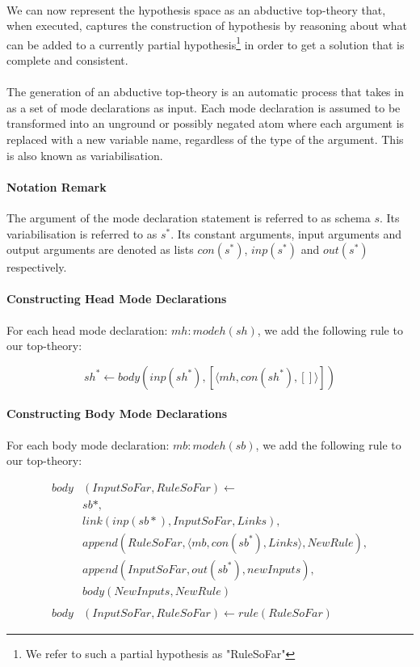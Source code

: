 \documentclass{article}
\theoremstyle{plain}
\theoremstyle{definition}
\begin{document}
\begin{multicols}{2}
\paragraph{} We can now represent the hypothesis space as an abductive top-theory that, when executed, captures the construction of hypothesis by reasoning about what can be added to a currently partial hypothesis\footnote{We refer to such a partial hypothesis as "RuleSoFar"} in order to get a solution that is complete and consistent.

\paragraph{} The generation of an abductive top-theory is an automatic process that takes in as a set of mode declarations as input. Each mode declaration is assumed to be transformed into an unground or possibly negated atom where each argument is replaced with a new variable name, regardless of the type of the argument. This is also known as variabilisation.

\paragraph{Notation Remark} The argument of the mode declaration statement is referred to as schema $s$. Its variabilisation is referred to as $s^*$. Its constant arguments, input arguments and output arguments are denoted as lists $con(s^*)$, $inp(s^*)$ and $out(s^*)$ respectively.

\paragraph{Constructing Head Mode Declarations} For each head mode declaration: $mh: modeh(sh)$, we add the following rule to our top-theory:

$$sh^* \leftarrow body(inp(sh^*), [\langle mh, con(sh^*), [] \rangle])$$


\paragraph{Constructing Body Mode Declarations} For each body mode declaration: $mb: modeh(sb)$, we add the following rule to our top-theory:

{\footnotesize
\begin{align*}
body&(InputSoFar, RuleSoFar) \leftarrow\\
& sb*,\\
& link(inp(sb*), InputSoFar, Links),\\
& append(RuleSoFar, \langle mb, con(sb^*), Links\rangle, NewRule),\\
& append(InputSoFar, out(sb^*), newInputs),\\
& body(NewInputs, NewRule)\\
\\
body&(InputSoFar, RuleSoFar) \leftarrow rule(RuleSoFar)
\end{align*}
}


\end{multicols}
\end{document}
